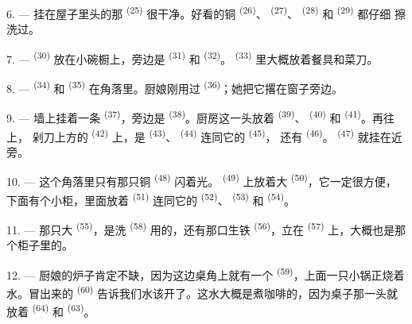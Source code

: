\VUsaut{4.0mm}
\VUsaut{3.0mm}

6. --- 挂在屋子里头的那 \textsuperscript{(25)} 很干净。好看的铜
 \textsuperscript{(26)}、 \textsuperscript{(27)}、
 \textsuperscript{(28)} 和 \textsuperscript{(29)} 都仔细
擦洗过。

7. ---  \textsuperscript{(30)} 放在小碗橱上，旁边是
\textsuperscript{(31)} 和 \textsuperscript{(32)}。
\textsuperscript{(33)} 里大概放着餐具和菜刀。

8. ---  \textsuperscript{(34)} 和 \textsuperscript{(35)}
在角落里。厨娘刚用过 \textsuperscript{(36)}；她把它撂在窗子旁边。

9. --- 墙上挂着一条 \textsuperscript{(37)}，旁边是
\textsuperscript{(38)}。厨房这一头放着 \textsuperscript{(39)}、
 \textsuperscript{(40)} 和 \textsuperscript{(41)}。再往上，
剁刀上方的 \textsuperscript{(42)} 上，是 \textsuperscript{(43)}、
 \textsuperscript{(44)} 连同它的 \textsuperscript{(45)}，
还有 \textsuperscript{(46)}。 \textsuperscript{(47)} 就挂在近旁。

10. --- 这个角落里只有那只铜 \textsuperscript{(48)} 闪着光。 \textsuperscript{(49)}
上放着大
 \textsuperscript{(50)}，它一定很方便，下面有个小柜，里面放着
 \textsuperscript{(51)} 连同它的 \textsuperscript{(52)}、
 \textsuperscript{(53)} 和 \textsuperscript{(54)}。

\VUsaut{4.0mm}
\VUsaut{3.0mm}

11. --- 那只大 \textsuperscript{(55)}，是洗
\textsuperscript{(58)} 用的，还有那口生铁 \textsuperscript{(56)}，立在
 \textsuperscript{(57)} 上，大概也是那个柜子里的。

12. --- 厨娘的炉子肯定不缺，因为这边桌角上就有一个
\textsuperscript{(59)}，上面一只小锅正烧着水。冒出来的 \textsuperscript{(60)}
告诉我们水该开了。这水大概是煮咖啡的，因为桌子那一头就放着
\textsuperscript{(64)} 和 \textsuperscript{(63)}。

